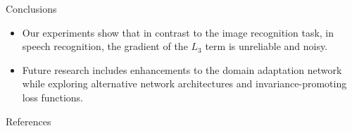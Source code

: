\documentclass[final]{beamer}
\newlength{\onecolwid}
\begin{document}
\begin{frame}[t]
\begin{columns}[t]
\begin{column}{\onecolwid}
\begin{block}{Conclusions}
\begin{itemize}
        \item Our experiments show that in contrast to the image recognition task, in speech recognition, the 
    gradient of the $L_3$ term is unreliable and noisy. 
    
        \item Future research includes enhancements to the domain adaptation network while exploring 
            alternative network architectures and invariance-promoting loss functions.
    \end{itemize}
\end{block}
\begin{block}{References}
    
    
\end{block}




\end{column} %

\end{columns} %

\end{frame} %
\end{document}
